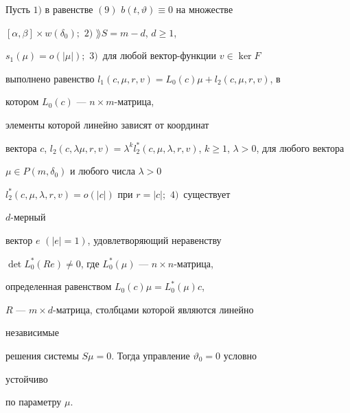 \begin{thm} 


Пусть $1)$ в равенстве $(9)$ $b(t,\vartheta)\equiv0$ на множестве 


$[\alpha,\beta]\times w(\delta_0);$ $2)$ $\rang S=m-d$, $d\ge1$, 


$s_1(\mu)=o(|\mu|);$ $3)$~для любой вектор-функции $v\in\ker F$ 


выполнено равенство $l_1(c,\mu,r,v)=L_0(c)\mu+l_2(c,\mu,r,v)$, в 


котором $L_0(c)$ --- $n\times m$-матрица, 


элементы которой линейно зависят от координат 


вектора $c$, $l_2(c,\lambda\mu,r,v)=\lambda^k 


l^*_2(c,\mu,\lambda,r,v)$, $k\ge1$, $\lambda>0$, для любого вектора 


$\mu\in P(m,\delta_0)$ и любого числа $\lambda>0$\; 


$l^*_2(c,\mu,\lambda,r,v)=o(|c|)$ при $r=|c|;$ $4)$~существует 


$d$-мерный 


вектор $e$ $(|e|=1)$, удовлетворяющий неравенству 


$\det L^*_0(Re)\ne0$, где $L^*_0(\mu)$ --- $n\times n$-матрица, 


определенная равенством $L_0(c)\mu=L^*_0(\mu)c$, 


$R$ --- $m\times d$-матрица, столбцами которой являются линейно 


независимые 


решения системы $S\mu=0$. Тогда управление $\vartheta_0=0$ условно 


устойчиво 


по параметру $\mu$. 


\end{thm} 


 



